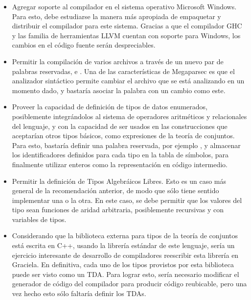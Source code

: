 \begin{itemize}

  \item Agregar soporte al compilador en el sistema operativo Microsoft Windows.
  Para esto, debe estudiarse la manera más apropiada de empaquetar y distribuir
  el compilador para este sistema. Gracias a que el compilador GHC y las familia
  de herramientas LLVM cuentan con soporte para Windows, los cambios en el
  código fuente serán despreciables.

  \item Permitir la compilación de varios archivos a través de un nuevo par de
  palabras reservadas,  e . Una de las
  características de Megaparsec es que el analizador sintáctico permite cambiar
  el archivo que se está analizando en un momento dado, y bastaría asociar la
  palabra  con un cambio como este.

  \item Proveer la capacidad de definición de tipos de datos enumerados,
  posiblemente integrándolos al sistema de operadores aritméticos y relacionales
  del lenguaje, y con la capacidad de ser usados en las construcciones que
  aceptarían otros tipos básicos, como expresiones de la teoría de conjuntos.
  Para esto, bastaría definir una palabra reservada, por ejemplo ,
  y almacenar los identificadores definidos para cada tipo en la tabla de símbolos,
  para finalmente utilizar enteros como la representación en código intermedio.

  \item Permitir la definición de Tipos Algebráicos Libres. Esto es un caso más
  general de la recomendación anterior, de modo que sólo tiene sentido
  implementar una o la otra. En este caso, se debe permitir que los valores del
  tipo sean funciones de aridad arbitraria, posiblemente recursivas y con
  variables de tipos.

  \item Considerando que la biblioteca externa para tipos de la teoría de
  conjuntos está escrita en C++, usando la librería estándar de este lenguaje,
  sería un ejercicio interesante de desarrollo de compiladores reescribir esta
  librería en Graciela. En definitiva, cada uno de los tipos provistos por esta
  biblioteca puede ser visto como un TDA. Para lograr esto, sería necesario
  modificar el generador de código del compilador para producir código
  reubicable, pero una vez hecho esto sólo faltaría definir los TDAs.


\end{itemize}
